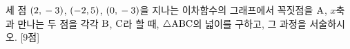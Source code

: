 세 점 $(2{,}\mkern3mu -3)$, $(-2{,}\mkern3mu 5)$, $(0{,}\mkern3mu -3)$을 지나는 이차함수의 그래프에서 꼭짓점을 $\mathrm{A}$, $x$축과 만나는 두 점을 각각 $\mathrm{B}$, $\mathrm{C}$라 할 때, $\triangle\mathrm{ABC}$의 넓이를 구하고, 그 과정을 서술하시오. \mbox{[9점]}
